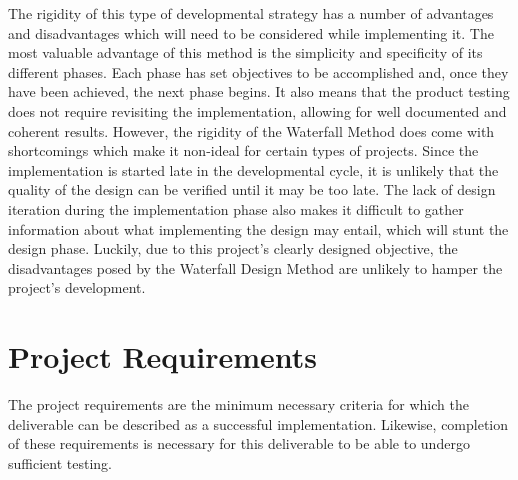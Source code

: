 The rigidity of this type of developmental strategy has a number of advantages and disadvantages which will need to be considered while implementing it. The most valuable advantage of this method is the simplicity and specificity of its different phases. Each phase has set objectives to be accomplished and, once they have been achieved, the next phase begins.  It also means that the product testing does not require revisiting the implementation, allowing for well documented and coherent results. However, the rigidity of the Waterfall Method does come with shortcomings which make it non-ideal for certain types of projects. Since the implementation is started late in the developmental cycle, it is unlikely that the quality of the design can be verified until it may be too late. The lack of design iteration during the implementation phase also makes it difficult to gather information about what implementing the design may entail, which will stunt the design phase. Luckily, due to this project's clearly designed objective, the disadvantages posed by the Waterfall Design Method are unlikely to hamper the project's development. 

\section{Project Requirements}
The project requirements are the minimum necessary criteria for which the deliverable can be described as a successful implementation. Likewise, completion of these requirements is necessary for this deliverable to be able to undergo sufficient testing. 


